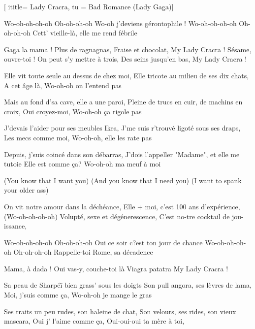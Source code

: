  [
ititle= {Lady Cracra},
tu = {Bad Romance (Lady Gaga)}]


\beginchorus
Wo-oh-oh-oh-oh Oh-oh-oh-oh
Wo-oh j'deviens gérontophile !
Wo-oh-oh-oh-oh Oh-oh-oh-oh
Cett' vieille-là, elle me rend fébrile
\endchorus

\beginverse
Gaga la mama !
Plus de ragnagnas,
Fraise et chocolat,
My Lady Cracra !
Sésame, ouvre-toi !
On peut s'y mettre à trois,
Des seins jusqu'en bas,
My Lady Cracra !
\endverse

\beginverse
Elle vit toute seule au dessus de chez moi,
Elle tricote au milieu de ses dix chats,
A cet âge là,
Wo-oh-oh on l'entend pas
\endverse

\beginverse
Mais au fond d'sa cave, elle a une paroi,
Pleine de trucs en cuir, de machins en croix,
Oui croyez-moi,
Wo-oh-oh ça rigole pas
\endverse

\beginverse
J'devais l'aider pour ses meubles Ikea,
J'me suis r'trouvé ligoté sous ses draps,
Les mecs comme moi,
Wo-oh-oh, elle les rate pas
\endverse

\beginverse
Depuis, j'suis coincé dans son débarras,
J'dois l'appeller "Madame", et elle me tutoie
Elle est comme ça?
Wo-oh-oh ma meuf à moi
\endverse

\beginverse
(You know that I want you)
(And you know that I need you)
(I want to spank your older ass)
\endverse

\beginverse
On vit notre amour dans la déchéance,
Elle + moi, c'est 100 ans d'expérience,
(Wo-oh-oh-oh-oh)
Volupté, sexe et dégénerescence,
C'est no-tre cocktail de jou-issance,
\endverse

\beginchorus
Wo-oh-oh-oh-oh Oh-oh-oh-oh
Oui ce soir c?est ton jour de chance
Wo-oh-oh-oh-oh Oh-oh-oh-oh
Rappelle-toi Rome, sa décadence
\endchorus

\beginverse
Mama, à dada !
Oui vas-y, couche-toi là
Viagra patatra
My Lady Cracra !
\endverse

\beginverse
Sa peau de Sharpéï bien grass' sous les doigts
Son pull angora, ses lèvres de lama,
Moi, j'suis comme ça,
Wo-oh-oh je mange le gras
\endverse

\beginverse
Ses traits un peu rudes, son haleine de chat,
Son velours, ses rides, son vieux mascara,
Oui j' l'aime comme ça,
Oui-oui-oui ta mère à toi,
\endverse

